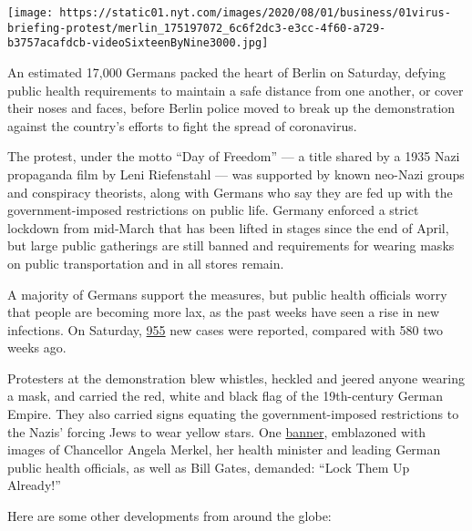 \texttt{[image: https://static01.nyt.com/images/2020/08/01/business/01virus-briefing-protest/merlin\_175197072\_6c6f2dc3-e3cc-4f60-a729-b3757acafdcb-videoSixteenByNine3000.jpg]}

An estimated 17,000 Germans packed the heart of Berlin on Saturday,
defying public health requirements to maintain a safe distance from one
another, or cover their noses and faces, before Berlin police moved to
break up the demonstration against the country's efforts to fight the
spread of coronavirus.

The protest, under the motto ``Day of Freedom'' --- a title shared by a
1935 Nazi propaganda film by Leni Riefenstahl --- was supported by known
neo-Nazi groups and conspiracy theorists, along with Germans who say
they are fed up with the government-imposed restrictions on public life.
Germany enforced a strict lockdown from mid-March that has been lifted
in stages since the end of April, but large public gatherings are still
banned and requirements for wearing masks on public transportation and
in all stores remain.

A majority of Germans support the measures, but public health officials
worry that people are becoming more lax, as the past weeks have seen a
rise in new infections. On Saturday,
\href{https://www.rki.de/DE/Content/InfAZ/N/Neuartiges_Coronavirus/Situationsberichte/2020-08-01-en.pdf?__blob=publicationFile}{955}
new cases were reported, compared with 580 two weeks ago.

Protesters at the demonstration blew whistles, heckled and jeered anyone
wearing a mask, and carried the red, white and black flag of the
19th-century German Empire. They also carried signs equating the
government-imposed restrictions to the Nazis' forcing Jews to wear
yellow stars. One
\href{https://twitter.com/BenjAlvarez1/status/1289490832815345665/photo/1}{banner},
emblazoned with images of Chancellor Angela Merkel, her health minister
and leading German public health officials, as well as Bill Gates,
demanded: ``Lock Them Up Already!''

Here are some other developments from around the globe:

